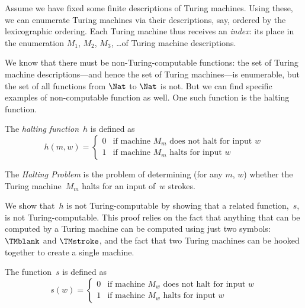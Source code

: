 \documentclass[../../../include/open-logic-section]{subfiles}
\begin{document}

\begin{explain}
Assume we have fixed some finite descriptions of Turing machines.
Using these, we can enumerate Turing machines via their descriptions,
say, ordered by the lexicographic ordering.  Each Turing machine thus
receives an \emph{index}: its place in the enumeration $M_1$, $M_2$,
$M_3$, \dots of Turing machine descriptions.

We know that there must be non-Turing-computable functions: the set of
Turing machine descriptions---and hence the set of Turing machines---is
enumerable, but the set of all functions from $\Nat$ to $\Nat$ is
not. But we can find specific examples of non-computable function as
well. One such function is the halting function.
\end{explain}

\begin{defn} The \emph{halting function}~$h$ is defined as
\[
h(m,w) =
\begin{cases}
  \text{0} & \text{if machine~$M_m$ does not halt for input $w$} \\
  \text{1} & \text{if machine~$M_m$ halts for input $w$}
\end{cases}
\]
\end{defn}

\begin{defn}
The \emph{Halting Problem} is the problem of determining (for any $m$, $w$)
whether the Turing machine~$M_m$ halts for an input of~$w$ strokes.
\end{defn}

\begin{explain}
We show that~$h$ is not Turing-computable by showing that a related
function,~$s$, is not Turing-computable. This proof relies on the fact
that anything that can be computed by a Turing machine can be computed
using just two symbols: $\TMblank$ and $\TMstroke$, and the fact that two
Turing machines can be hooked together to create a single machine.
\end{explain}

\begin{defn} The function~$s$ is defined as
\[
s(w) =
\begin{cases}
  \text{0} & \text{if machine~$M_w$ does not halt for input $w$} \\
  \text{1} & \text{if machine~$M_w$ halts for input $w$}
\end{cases}
\]
\end{defn}
\end{document}
